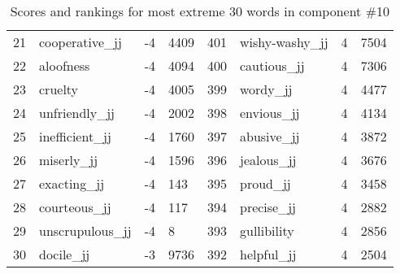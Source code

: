 \begin{table}[tbp]
\begin{tabular}{| rlr@{.}l | rlr@{.}l |}
    21 & cooperative\_jj & -4 & 4409    &    401 & wishy-washy\_jj & 4 & 7504 \\
    22 & aloofness & -4 & 4094    &    400 & cautious\_jj & 4 & 7306 \\
    23 & cruelty & -4 & 4005    &    399 & wordy\_jj & 4 & 4477 \\
    24 & unfriendly\_jj & -4 & 2002    &    398 & envious\_jj & 4 & 4134 \\
    25 & inefficient\_jj & -4 & 1760    &    397 & abusive\_jj & 4 & 3872 \\
    26 & miserly\_jj & -4 & 1596    &    396 & jealous\_jj & 4 & 3676 \\
    27 & exacting\_jj & -4 & 143    &    395 & proud\_jj & 4 & 3458 \\
    28 & courteous\_jj & -4 & 117    &    394 & precise\_jj & 4 & 2882 \\
    29 & unscrupulous\_jj & -4 & 8    &    393 & gullibility & 4 & 2856 \\
    30 & docile\_jj & -3 & 9736    &    392 & helpful\_jj & 4 & 2504 \\
    \hline
    \end{tabular}
    \caption{Scores and rankings for most extreme 30 words in component \#10} 
\end{table}
\clearpage
